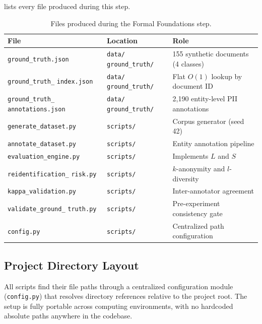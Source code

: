 \documentclass[12pt, a4paper]{report}
\begin{document}
 lists every file produced during this step.

\begin{table}[H]
\centering
\caption{Files produced during the Formal Foundations step.}
\label{tab:deliverables}
\scriptsize
\setlength{\tabcolsep}{3pt}
\begin{tabular}{L{3.3cm} L{2.2cm} L{6.6cm}}
\toprule
{}
\color{white}\textbf{File} &
\color{white}\textbf{Location} &
\color{white}\textbf{Role} \\
\midrule
\texttt{ground\_truth.json}           & \texttt{data/} \texttt{ground\_truth/} & 155 synthetic documents (4 classes) \\
\texttt{ground\_truth\_} \texttt{index.json} & \texttt{data/} \texttt{ground\_truth/} & Flat $O(1)$ lookup by document ID \\
\texttt{ground\_truth\_} \texttt{annotations.json} & \texttt{data/} \texttt{ground\_truth/} & 2{,}190 entity-level PII annotations \\
\texttt{generate\_dataset.py}         & \texttt{scripts/}  & Corpus generator (seed 42) \\
\texttt{annotate\_dataset.py}         & \texttt{scripts/}  & Entity annotation pipeline \\
\texttt{evaluation\_engine.py}        & \texttt{scripts/}  & Implements $L$ and $S$ \\
\texttt{reidentification\_} \texttt{risk.py} & \texttt{scripts/}  & $k$-anonymity and $l$-diversity \\
\texttt{kappa\_validation.py}         & \texttt{scripts/}  & Inter-annotator agreement \\
\texttt{validate\_ground\_} \texttt{truth.py} & \texttt{scripts/}  & Pre-experiment consistency gate \\
\texttt{config.py}                         & \texttt{scripts/}           & Centralized path configuration \\
\bottomrule
\end{tabular}
\setlength{\tabcolsep}{6pt}
\end{table}

\subsection{Project Directory Layout}

All scripts find their file paths through a centralized configuration module (\texttt{config.py}) that resolves directory references relative to the project root. The setup is fully portable across computing environments, with no hardcoded absolute paths anywhere in the codebase.
\end{document}
